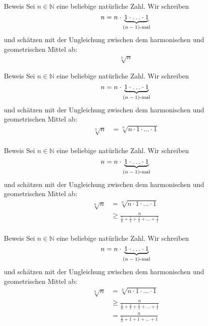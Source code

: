 \documentclass[10pt]{beamer}
\def\bN{\mathbb{N}}
\begin{document}
\begin{frame}{Beweis}
    Sei \( n \in \bN \) eine beliebige natürliche Zahl. Wir schreiben
    \[ 
        n = n \cdot \underbrace{1 \cdot \ldots \cdot 1}_{\text{\( \left( n - 1 \right) \)-mal}} 
    \] 
    und schätzen mit der Ungleichung zwischen dem harmonischen und geometrischen Mittel ab:
    \begin{align*}
        \sqrt[n]{n}
    \end{align*}
\end{frame}



\begin{frame}{Beweis}
    Sei \( n \in \bN \) eine beliebige natürliche Zahl. Wir schreiben
    \[ 
        n = n \cdot \underbrace{1 \cdot \ldots \cdot 1}_{\text{\( \left( n - 1 \right) \)-mal}} 
    \] 
    und schätzen mit der Ungleichung zwischen dem harmonischen und geometrischen Mittel ab:
    \begin{align*}
        \sqrt[n]{n}
        & = \sqrt[n]{n \cdot 1 \cdot \ldots \cdot 1} \\
    \end{align*}
\end{frame}



\begin{frame}{Beweis}
    Sei \( n \in \bN \) eine beliebige natürliche Zahl. Wir schreiben
    \[ 
        n = n \cdot \underbrace{1 \cdot \ldots \cdot 1}_{\text{\( \left( n - 1 \right) \)-mal}} 
    \] 
    und schätzen mit der Ungleichung zwischen dem harmonischen und geometrischen Mittel ab:
    \begin{align*}
        \sqrt[n]{n}
        & = \sqrt[n]{n \cdot 1 \cdot \ldots \cdot 1} \\
        & \geq \frac{n}{\frac{1}{n} + \frac{1}{1} + \frac{1}{1} + \ldots + \frac{1}{1}} \\
    \end{align*}
\end{frame}



\begin{frame}{Beweis}
    Sei \( n \in \bN \) eine beliebige natürliche Zahl. Wir schreiben
    \[ 
        n = n \cdot \underbrace{1 \cdot \ldots \cdot 1}_{\text{\( \left( n - 1 \right) \)-mal}} 
    \] 
    und schätzen mit der Ungleichung zwischen dem harmonischen und geometrischen Mittel ab:
    \begin{align*}
        \sqrt[n]{n}
        & = \sqrt[n]{n \cdot 1 \cdot \ldots \cdot 1} \\
        & \geq \frac{n}{\frac{1}{n} + \frac{1}{1} + \frac{1}{1} + \ldots + \frac{1}{1}} \\
        & =	\frac{n}{\frac{1}{n} + 1 + 1 + \ldots + 1} \\
    \end{align*}
\end{frame}
\end{document}
